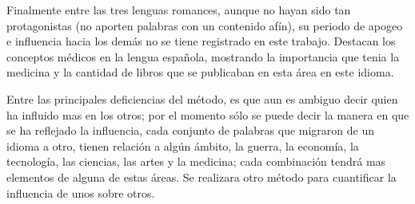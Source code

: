 Finalmente entre las tres lenguas romances, aunque no hayan sido tan
protagonistas (no aporten palabras con un contenido afín),  su periodo de
apogeo e influencia hacia los demás no se tiene registrado en este trabajo.
Destacan los conceptos médicos en la lengua española, mostrando la importancia
que tenia la medicina y la cantidad de libros que se publicaban en esta área en
este idioma. 

Entre las principales deficiencias del método, es que aun es ambiguo decir
quien ha influido mas en los otros; por el momento sólo se puede decir la
manera en que se ha reflejado la influencia, cada conjunto de palabras que
migraron de un idioma a otro, tienen relación a algún ámbito, la guerra, la
economía, la tecnología, las ciencias, las artes y la medicina; cada
combinación tendrá mas elementos de alguna de estas áreas.  Se realizara otro
método para cuantificar la influencia de unos sobre otros. 


